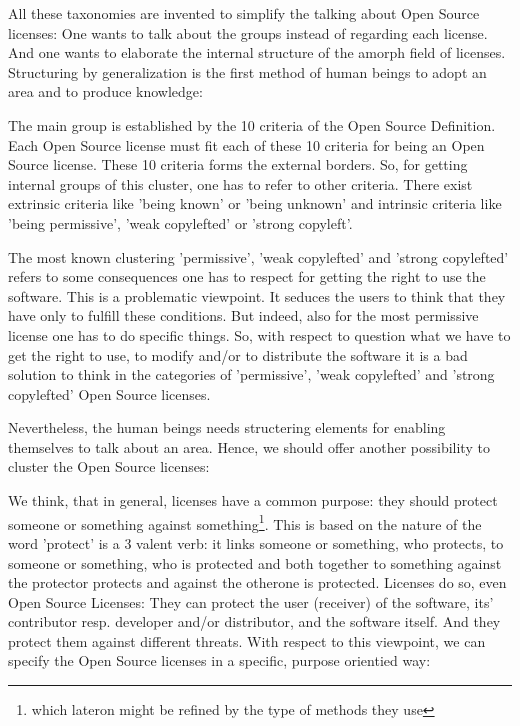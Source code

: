 
All these taxonomies are invented to simplify the talking about Open Source
licenses: One wants to talk about the groups instead of regarding each license.
And one wants to elaborate the internal structure of the amorph field of
licenses. Structuring by generalization is the first method of human beings to
adopt an area and to produce knowledge:

The main group is established by the 10 criteria of the Open Source Definition.
Each Open Source license must fit each of these 10 criteria for being an Open
Source license. These 10 criteria forms the external borders. So, for getting
internal groups of this cluster, one has to refer to other criteria. There exist
extrinsic criteria like 'being known' or 'being unknown' and intrinsic criteria
like 'being permissive', 'weak copylefted' or 'strong copyleft'.

The most known clustering 'permissive', 'weak copylefted' and 'strong
copylefted' refers to some consequences one has to respect for getting the right
to use the software. This is a problematic viewpoint. It seduces the users to
think that they have only to fulfill these conditions. But indeed, also for the
most permissive license one has to do specific things. So, with respect to
question what we have to get the right to use, to modify and/or to distribute
the software it is a bad solution to think in the categories of 'permissive',
'weak copylefted' and 'strong copylefted' Open Source licenses.

Nevertheless, the human beings needs structering elements for enabling
themselves to talk about an area. Hence, we should offer another possibility to
cluster the Open Source licenses:

We think, that in general, licenses have a common purpose: they should protect
someone or something against something\footnote{which lateron might be refined
by the type of methods they use}. This is based on the nature of the word
'protect' is a 3 valent verb: it links someone or something, who protects, to
someone or something, who is protected and both together to something against
the protector protects and against the otherone is protected. Licenses do so,
even Open Source Licenses: They can protect the user (receiver) of the software,
its' contributor resp. developer and/or distributor, and the software itself.
And they protect them against different threats. With respect to this viewpoint,
we can specify the Open Source licenses in a specific, purpose orientied way:

